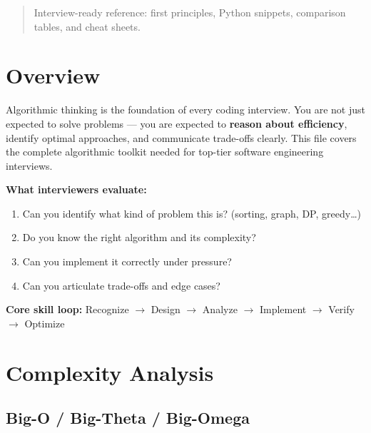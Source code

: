 \documentclass[11pt]{article}
\providecommand{\tightlist}{\setlength{\itemsep}{1pt}\setlength{\parskip}{0pt}}
\begin{document}
\makecoverpage

\thispagestyle{empty}
{\hypersetup{hidelinks}\tableofcontents}
\clearpage

\begin{quote}
Interview-ready reference: first principles, Python snippets, comparison tables, and cheat sheets.
\end{quote}

\section{Overview}\label{overview}

Algorithmic thinking is the foundation of every coding interview. You are not just expected to solve problems --- you are expected to \textbf{reason about efficiency}, identify optimal approaches, and communicate trade-offs clearly. This file covers the complete algorithmic toolkit needed for top-tier software engineering interviews.

\textbf{What interviewers evaluate:}

\begin{enumerate}
\def\labelenumi{\arabic{enumi}.}
\tightlist
\item
  Can you identify what kind of problem this is? (sorting, graph, DP, greedy\ldots)
\item
  Do you know the right algorithm and its complexity?
\item
  Can you implement it correctly under pressure?
\item
  Can you articulate trade-offs and edge cases?
\end{enumerate}

\textbf{Core skill loop:} Recognize \(\rightarrow\) Design \(\rightarrow\) Analyze \(\rightarrow\) Implement \(\rightarrow\) Verify \(\rightarrow\) Optimize

\section{Complexity Analysis}\label{complexity-analysis}

\subsection{Big-O / Big-Theta / Big-Omega}\label{big-o--big-theta--big-omega}

\end{document}

